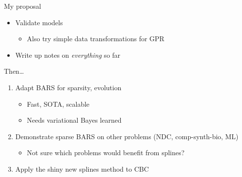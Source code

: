 \documentclass[presentation]{beamer}
\begin{document}
\begin{frame}[label={sec:orgae3b572}]{My proposal}
\begin{itemize}
\item Validate models
\begin{itemize}
\item \alert{Also try simple data transformations for GPR}
\end{itemize}
\item Write up notes on \emph{everything} so far

\vfill
\end{itemize}
Then\ldots{}
\begin{enumerate}
\item Adapt BARS for sparsity, evolution
\begin{itemize}
\item Fast, SOTA, scalable
\item Needs variational Bayes learned
\end{itemize}
\item Demonstrate sparse BARS on other problems (NDC, comp-synth-bio, ML)
\begin{itemize}
\item Not sure which problems would benefit from splines?
\end{itemize}
\item Apply the shiny new splines method to CBC
\end{enumerate}
\end{frame}
\end{document}
